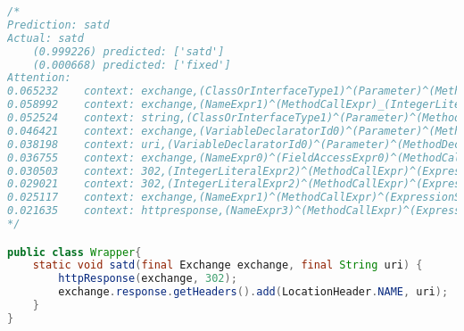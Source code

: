 \begin{lstlisting}[basicstyle=\tiny,caption={Case-2 SATD}, label={},language=Java,breaklines=true,
  postbreak=\mbox{\textcolor{red}{$\hookrightarrow$}\space}]
/*
Prediction:	satd
Actual:	satd
	(0.999226) predicted: ['satd']
	(0.000668) predicted: ['fixed']
Attention:
0.065232	context: exchange,(ClassOrInterfaceType1)^(Parameter)^(MethodDeclaration)_(BlockStmt)_(ExpressionStmt)_(MethodCallExpr0)_(IntegerLiteralExpr2),302
0.058992	context: exchange,(NameExpr1)^(MethodCallExpr)_(IntegerLiteralExpr2),302
0.052524	context: string,(ClassOrInterfaceType1)^(Parameter)^(MethodDeclaration)_(BlockStmt)_(ExpressionStmt)_(MethodCallExpr0)_(IntegerLiteralExpr2),302
0.046421	context: exchange,(VariableDeclaratorId0)^(Parameter)^(MethodDeclaration)_(BlockStmt)_(ExpressionStmt)_(MethodCallExpr0)_(IntegerLiteralExpr2),302
0.038198	context: uri,(VariableDeclaratorId0)^(Parameter)^(MethodDeclaration)_(BlockStmt)_(ExpressionStmt)_(MethodCallExpr0)_(IntegerLiteralExpr2),302
0.036755	context: exchange,(NameExpr0)^(FieldAccessExpr0)^(MethodCallExpr0)^(MethodCallExpr)_(FieldAccessExpr2)_(NameExpr0),locationheader
0.030503	context: 302,(IntegerLiteralExpr2)^(MethodCallExpr)^(ExpressionStmt)^(BlockStmt)_(ExpressionStmt)_(MethodCallExpr0)_(MethodCallExpr0)_(FieldAccessExpr0)_(NameExpr0),exchange
0.029021	context: 302,(IntegerLiteralExpr2)^(MethodCallExpr)^(ExpressionStmt)^(BlockStmt)_(ExpressionStmt)_(MethodCallExpr0)_(FieldAccessExpr2)_(NameExpr0),locationheader
0.025117	context: exchange,(NameExpr1)^(MethodCallExpr)^(ExpressionStmt)^(BlockStmt)_(ExpressionStmt)_(MethodCallExpr0)_(FieldAccessExpr2)_(NameExpr0),locationheader
0.021635	context: httpresponse,(NameExpr3)^(MethodCallExpr)^(ExpressionStmt)^(BlockStmt)_(ExpressionStmt)_(MethodCallExpr0)_(MethodCallExpr0)_(FieldAccessExpr0)_(NameExpr0),exchange
*/

public class Wrapper{
    static void satd(final Exchange exchange, final String uri) {
        httpResponse(exchange, 302);
        exchange.response.getHeaders().add(LocationHeader.NAME, uri);
    }
}
\end{lstlisting}

